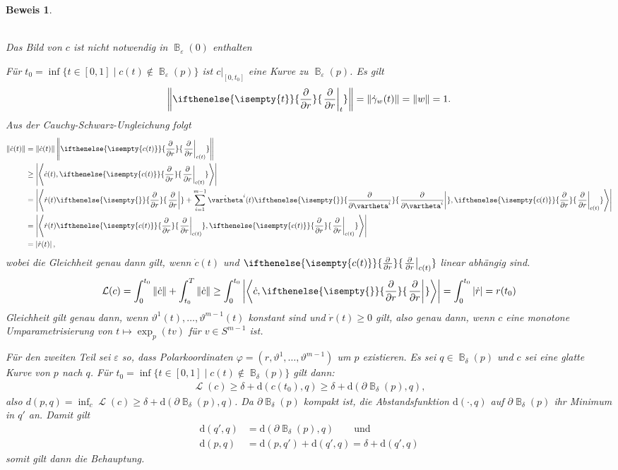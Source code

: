 \documentclass[paper=A4, twoside, chapterprefix=true, bibliography=totoc, headsepline]{scrbook}
\let\temp\phi{}
\let\phi\varphi{}
\let\varphi\temp{}
\let\temp\theta{}
\let\theta\vartheta{}
\let\vartheta\temp{}
\let\temp\epsilon{}
\let\epsilon\varepsilon{}
\let\varepsilon\temp{}
\let\temp\rho{}
\let\rho\varrho{}
\let\varrho\temp{}
\DeclareMathOperator{\B}{\mathbb{B}} %
\DeclareMathOperator{\calL}{\mathcal{L}}
\newcommand{\dop}{\mathrm{d}}
\newcommand{\pdifffrac}[3][]{\ifthenelse{\isempty{#1}}{\frac{\partial #2}{\partial #3}}{\left. \frac{\partial #2}{\partial #3} \right|_{#1}}}
\theoremstyle{plain}
\theoremstyle{nonumberplain}
\newtheorem{bew}{Beweis}
\theoremstyle{empty}
\theoremstyle{break}
\begin{document}
\begin{bew}
\begin{center}
\\
    Das Bild von $c$ ist nicht notwendig in $\B_\epsilon(0)$ enthalten
  \end{center}
  F\"ur $t_0 = \inf\{t \in [0,1] \mid c(t) \notin \B_{\epsilon}(p)\}$ ist $c|_{[0,t_0]}$ eine Kurve zu $\B_{\epsilon}(p)$.
  Es gilt
  \begin{align*}
    \left\|\pdifffrac[t]{}{r}\right\| = \|\dot\gamma_w(t)\| = \|w\| = 1.
  \end{align*}
  Aus der Cauchy-Schwarz-Ungleichung folgt
  \begin{align*}
    \|\dot c(t)\| & = \|\dot c(t)\|\left\|\pdifffrac[c(t)]{}{r}\right\|\\
    & \geq \left|\left< \dot c(t), \pdifffrac[c(t)]{}{r}\right>\right|\\
    & = \left|\left<\dot r(t) \pdifffrac{}{r} + \sum_{i=1}^{m-1}\dot\theta^i(t)\pdifffrac{}{\theta^i},\pdifffrac[c(t)]{}{r}\right>\right|\\
    & = \left|\left<\dot r(t)\pdifffrac[c(t)]{}{r}, \pdifffrac[c(t)]{}{r}\right>\right|\\
    & = \left|\dot r(t)\right|,
  \end{align*}
  wobei die Gleichheit genau dann gilt, wenn $\dot c(t)$ und $\pdifffrac[c(t)]{}{r}$ linear abh\"angig sind.
  \begin{align*}
    \mathcal L(c) = \int_0^{t_0}\|\dot c\| + \int_{t_0}^T\|\dot c\| \geq \int_0^{t_0} \left|\left<\dot c,\pdifffrac{}{r}\right>\right| = \int_0^{t_0}|\dot r| = r(t_0)
  \end{align*}
  Gleichheit gilt genau dann, wenn $\theta^1(t), \ldots, \theta^{m-1}(t)$ konstant sind und $\dot r(t) \geq 0$ gilt, also genau dann, wenn $c$ eine monotone Umparametrisierung von $t \mapsto \exp_p(tv)$ f\"ur $v \in S^{m-1}$ ist.

  F\"ur den zweiten Teil sei $\epsilon$ so, dass Polarkoordinaten $\phi=(r, \theta^1,\ldots ,\theta^{m-1})$ um $p$ existieren.
  Es sei $q \in \B_\delta(p)$ und $c$ sei eine glatte Kurve von $p$ nach $q$.
  F\"ur $t_0 = \inf \{ t \in [0,1] \mid c(t) \notin \B_\delta(p) \}$ gilt dann:
  \begin{align*}
    \calL(c) \ge \delta + \dop(c(t_0), q) \ge \delta + \dop(\partial \B_\delta(p), q),
  \end{align*}
  also $d(p,q) = \inf_c \calL(c) \ge \delta + \dop(\partial \B_\delta(p), q)$. Da $\partial \B_\delta(p)$ kompakt ist, die Abstandsfunktion $\dop(\cdot, q)$ auf $\partial \B_\delta(p)$ ihr Minimum in $q'$ an. Damit gilt
  \begin{align*}
    \dop(q',q) &= \dop(\partial \B_\delta(p), q) \qquad \text{und}\\
    \dop(p,q) &= \dop(p,q') + \dop(q',q) = \delta + \dop(q',q)
  \end{align*}
  somit gilt dann die Behauptung.
\end{bew}
\end{document}
